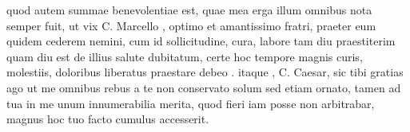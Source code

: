  quod autem summae benevolentiae est, quae mea erga illum omnibus nota semper fuit, ut vix C. Marcello , optimo et amantissimo fratri, praeter eum quidem cederem nemini, cum id sollicitudine, cura, labore tam diu praestiterim quam diu est de illius salute dubitatum, certe hoc tempore magnis curis, molestiis, doloribus liberatus praestare debeo . itaque , C. Caesar, sic tibi gratias ago ut me omnibus rebus a te non conservato solum sed etiam ornato, tamen ad tua in me unum innumerabilia merita, quod fieri iam posse non arbitrabar, magnus hoc tuo facto cumulus accesserit.
